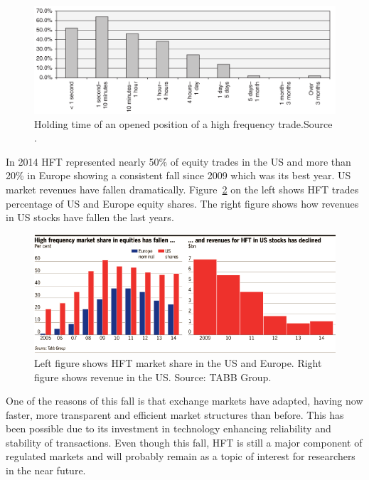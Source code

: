 \begin{figure}[!h]
  \centering
  \includegraphics[width=\textwidth]{img/HFTtradestime}
  \caption{Holding time of an opened position of a high frequency trade.Source
  \cite{aldridge2009}.}
  \label{fig:HFTtimes}
\end{figure}
In 2014 HFT represented nearly 50\% of equity trades in the US and more than
20\% in Europe showing a consistent fall since 2009 which was its best year. US
market revenues have fallen dramatically.  Figure~\ref{fig:HFTmarket} on the
left shows HFT trades percentage of US and Europe equity shares. The right
figure shows how revenues in US stocks have fallen the last years.

\begin{figure}[!h]
  \centering
  \includegraphics[width=\textwidth]{img/HFTmarket}
  \caption{Left figure shows HFT market share in the US and Europe. Right figure
  shows revenue in the US. Source: TABB Group.}
  \label{fig:HFTmarket}
\end{figure}
One of the reasons of this fall is that exchange markets have adapted, having
now faster, more transparent and efficient market structures than before.
This has been possible due to its investment in technology enhancing
reliability and stability of transactions. Even though this fall, HFT is still a major component of regulated markets and
will probably remain as a topic of interest for researchers in the near future.

